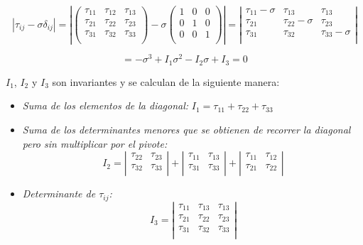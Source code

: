 \documentclass[a4paper,12pt,twoside,final,spanish]{article}
\begin{document}
\[
|\tau_{ij}-\sigma\delta_{ij}|=
\left|\left(\begin{matrix}
\tau_{11} & \tau_{12} & \tau_{13} \\
\tau_{21} & \tau_{22} & \tau_{23} \\
\tau_{31} & \tau_{32} & \tau_{33} \\
\end{matrix}\right)-\sigma
\left(\begin{matrix}
1 & 0 & 0 \\
0 & 1 & 0 \\
0 & 0 & 1 \\
\end{matrix}\right)\right|=
\left|\begin{matrix}
\tau_{11}-\sigma & \tau_{13} & \tau_{13} \\
\tau_{21} & \tau_{22}-\sigma & \tau_{23} \\
\tau_{31} & \tau_{32} & \tau_{33}-\sigma \\
\end{matrix}\right|
\]

\[
=-\sigma^{3}+I_{1}\sigma^{2}-I_{2}\sigma+I_{3}=0
\]

$I_{1}$, $I_{2}$ y $I_{3}$ son invariantes y se calculan de la siguiente manera:

\begin{itemize}
\item \textit{Suma de los elementos de la diagonal: }$I_{1} = \tau_{11}+\tau_{22}+\tau_{33}$

\item \textit{Suma de los determinantes menores que se obtienen de recorrer la diagonal pero sin multiplicar por el pivote: }
\[
I_{2}=
\left|\begin{matrix}
\tau_{22} & \tau_{23} \\
\tau_{32} & \tau_{33} \\
\end{matrix}\right|
+
\left|\begin{matrix}
\tau_{11} & \tau_{13} \\
\tau_{31} & \tau_{33} \\
\end{matrix}\right|
+
\left|\begin{matrix}
\tau_{11} & \tau_{12} \\
\tau_{21} & \tau_{22} \\
\end{matrix}\right|
\]

\item \textit{Determinante de $\tau_{ij}$: }
\[
I_{3}=
\left|
\begin{matrix}
\tau_{11} & \tau_{13} & \tau_{13} \\
\tau_{21} & \tau_{22} & \tau_{23} \\
\tau_{31} & \tau_{32} & \tau_{33} \\
\end{matrix}
\right|
\]
\end{itemize}
\end{document}
